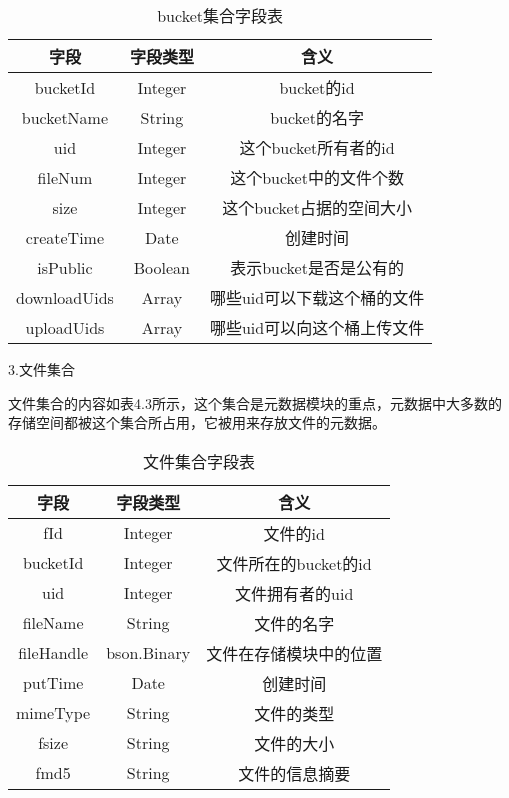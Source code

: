 \begin{table}[h]
    \centering
    \caption{bucket集合字段表}
    \begin{tabular}{ccc}
      \toprule
      字段   & 字段类型   & 含义                          \\
      \midrule
      bucketId      & Integer  & bucket的id                 \\
      bucketName    & String   & bucket的名字                \\
      uid           & Integer  & 这个bucket所有者的id         \\
      fileNum       & Integer  & 这个bucket中的文件个数         \\
      size          & Integer  & 这个bucket占据的空间大小         \\
      createTime    & Date     & 创建时间                     \\
      isPublic      & Boolean  & 表示bucket是否是公有的        \\
      downloadUids  & Array    & 哪些uid可以下载这个桶的文件  \\
      uploadUids    & Array    & 哪些uid可以向这个桶上传文件  \\
      \bottomrule
    \end{tabular}
\end{table}

3.文件集合

文件集合的内容如表4.3所示，这个集合是元数据模块的重点，元数据中大多数的存储空间都被这个集合所占用，它被用来存放文件的元数据。

\begin{table}[h]
  \centering
  \caption{文件集合字段表}
  \begin{tabular}{ccc}
    \toprule
    字段   & 字段类型   & 含义                          \\
    \midrule
    fId        & Integer     & 文件的id                 \\
    bucketId   & Integer     & 文件所在的bucket的id                 \\
    uid        & Integer     & 文件拥有者的uid                 \\
    fileName   & String      & 文件的名字                \\
    fileHandle & bson.Binary & 文件在存储模块中的位置         \\
    putTime    & Date        & 创建时间                     \\
    mimeType   & String      & 文件的类型        \\
    fsize      & String      & 文件的大小  \\
    fmd5       & String      & 文件的信息摘要  \\
    \bottomrule
  \end{tabular}
\end{table}

